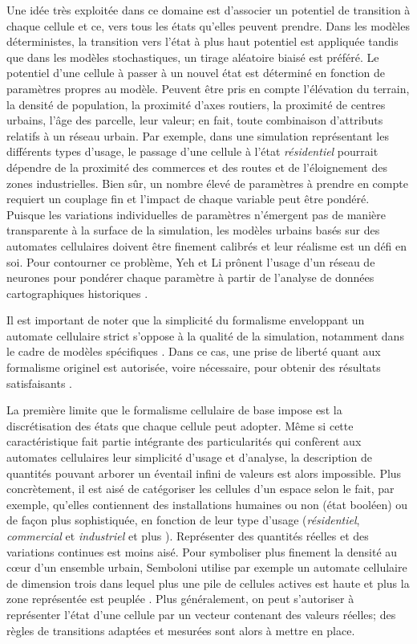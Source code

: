 \documentclass[12pt]{article}
\begin{document}
Une idée très exploitée dans ce domaine est d'associer un potentiel de
transition à chaque cellule et ce, vers tous les états qu'elles
peuvent prendre. Dans les modèles déterministes, la transition vers
l'état à plus haut potentiel est appliquée tandis que dans les modèles
stochastiques, un tirage aléatoire biaisé est préféré. Le potentiel
d'une cellule à passer à un nouvel état est déterminé en fonction de
paramètres propres au modèle. Peuvent être pris en compte l'élévation
du terrain, la densité de population, la proximité d'axes routiers, la
proximité de centres urbains, l'âge des parcelle, leur valeur; en
fait, toute combinaison d'attributs relatifs à un réseau urbain. Par
exemple, dans une simulation représentant les différents types
d'usage, le passage d'une cellule à l'état \textit{résidentiel}
pourrait dépendre de la proximité des commerces et des routes et de
l'éloignement des zones industrielles. Bien sûr, un nombre élevé de
paramètres à prendre en compte requiert un couplage fin et l'impact de
chaque variable peut être pondéré. Puisque les variations
individuelles de paramètres n'émergent pas de manière transparente à
la surface de la simulation, les modèles urbains basés sur des
automates cellulaires doivent être finement calibrés et leur réalisme
est un défi en soi. Pour contourner ce problème, Yeh et Li prônent
l'usage d'un réseau de neurones pour pondérer chaque paramètre à
partir de l'analyse de données cartographiques historiques
\cite{Yeh2002}.

Il est important de noter que la simplicité du formalisme enveloppant
un automate cellulaire strict s'oppose à la qualité de la simulation,
notamment dans le cadre de modèles spécifiques
\cite{Torrens2001}. Dans ce cas, une prise de liberté quant aux
formalisme originel est autorisée, voire nécessaire, pour obtenir des
résultats satisfaisants \cite{White1998}.

La première limite que le formalisme cellulaire de base impose est la
discrétisation des états que chaque cellule peut adopter. Même si
cette caractéristique fait partie intégrante des particularités qui
confèrent aux automates cellulaires leur simplicité d'usage et
d'analyse, la description de quantités pouvant arborer un éventail
infini de valeurs est alors impossible. Plus concrètement, il est aisé
de catégoriser les cellules d'un espace selon le fait, par exemple,
qu'elles contiennent des installations humaines ou non (état booléen)
\cite{Benguigui2004,Cornu2008} ou de façon plus sophistiquée, en fonction
de leur type d'usage (\textit{résidentiel}, \textit{commercial} et
\textit{industriel} \cite{Lechner} et plus
\cite{Dubos-Paillard203}). Représenter des quantités réelles et des
variations continues est moins aisé. Pour symboliser plus finement la
densité au c\oe ur d'un ensemble urbain, Semboloni utilise par exemple
un automate cellulaire de dimension trois dans lequel plus une pile de
cellules actives est haute et plus la zone représentée est peuplée
\cite{Semboloni2000}. Plus généralement, on peut s'autoriser à
représenter l'état d'une cellule par un vecteur contenant des valeurs
réelles; des règles de transitions adaptées et mesurées sont alors à
mettre en place.
\end{document}
